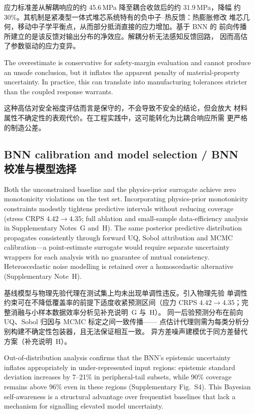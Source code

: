 \documentclass[11pt,a4paper]{article}
\begin{document}
应力标准差从解耦响应的约 45.6\,MPa 降至耦合收敛后的约 31.9\,MPa，降幅
约 30\%。其机制是紧凑型一体式堆芯系统特有的负中子--热反馈：热膨胀修改
堆芯几何，移动中子学平衡点，从而部分抵消直接的应力增加。基于 BNN 的
前向传播所建立的是该反馈对输出分布的净效应。解耦分析无法感知反馈回路，
因而高估了参数驱动的应力变异。

The overestimate is conservative for safety-margin evaluation and cannot
produce an unsafe conclusion, but it inflates the apparent penalty of
material-property uncertainty. In practice, this can translate into
manufacturing tolerances stricter than the coupled response warrants.

这种高估对安全裕度评估而言是保守的，不会导致不安全的结论，但会放大
材料属性不确定性的表观代价。在工程实践中，这可能转化为比耦合响应所需
更严格的制造公差。

\subsection{BNN calibration and model selection /
BNN 校准与模型选择}

Both the unconstrained baseline and the physics-prior surrogate achieve
zero monotonicity violations on the test set. Incorporating
physics-prior monotonicity constraints modestly tightens predictive
intervals without reducing coverage (stress CRPS $4.42 \to 4.35$;
full ablation and small-sample data-efficiency analysis in
Supplementary Notes~G and~H). The same posterior predictive
distribution propagates consistently through forward UQ, Sobol
attribution and MCMC calibration---a point-estimate surrogate would
require separate uncertainty wrappers for each analysis with no
guarantee of mutual consistency. Heteroscedastic noise modelling is
retained over a homoscedastic alternative (Supplementary Note~H).

基线模型与物理先验代理在测试集上均未出现单调性违反。引入物理先验
单调性约束可在不降低覆盖率的前提下适度收紧预测区间（应力 CRPS
$4.42 \to 4.35$；完整消融与小样本数据效率分析见补充说明~G 与~H）。
同一后验预测分布在前向 UQ、Sobol 归因与 MCMC 标定之间一致传播——
点估计代理则需为每类分析分别构建不确定性包装器，且无法保证相互一致。
异方差噪声建模优于同方差替代方案（补充说明~H）。

Out-of-distribution analysis confirms that the BNN's epistemic
uncertainty inflates appropriately in under-represented input regions:
epistemic standard deviation increases by 7--21\% in peripheral-tail
subsets, while 90\% coverage remains above 96\% even in these regions
(Supplementary Fig.~S4). This Bayesian self-awareness is a structural
advantage over frequentist baselines that lack a mechanism for
signalling elevated model uncertainty.
\end{document}
